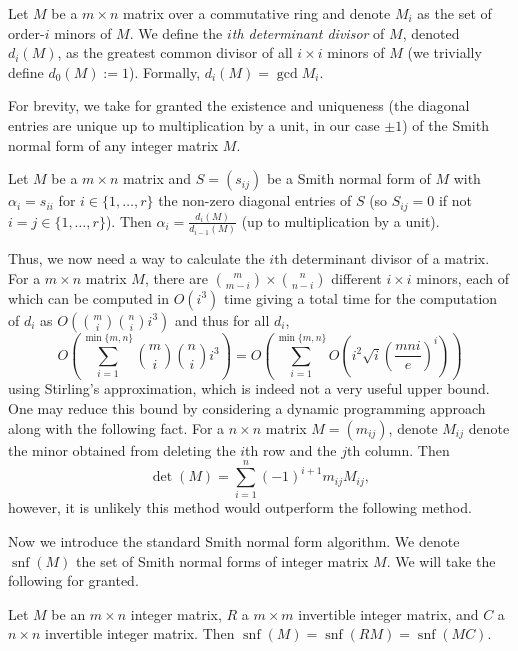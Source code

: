 \begin{definition}
	Let $M$ be a $m \times n$ matrix over a commutative ring and denote $M_i$ as the set of order-$i$ minors of $M$. We define the \emph{$i$th determinant divisor} of $M$, denoted $d_i(M)$, as the greatest common divisor of all $i \times i$ minors of $M$ (we trivially define $d_0(M) := 1$). Formally, $d_i(M) = \gcd M_i$.
\end{definition}

For brevity, we take for granted the existence and uniqueness (the diagonal entries are unique up to multiplication by a unit, in our case $\pm 1$) of the Smith normal form of any integer matrix $M$.

\begin{theorem}
	Let $M$ be a $m \times n$ matrix and $S = (s_{ij})$ be a Smith normal form of $M$ with $\alpha_i = s_{ii}$ for $i \in \{1, \ldots, r\}$ the non-zero diagonal entries of $S$ (so $S_{ij} = 0$ if not $i = j \in \{1, \ldots, r\}$). Then
	$\alpha_i = \frac{d_i(M)}{d_{i-1}(M)}$ (up to multiplication by a unit).
\end{theorem}

Thus, we now need a way to calculate the $i$th determinant divisor of a matrix. For a $m \times n$ matrix $M$, there are $\binom m{m-i} \times \binom n{n-i}$ different $i \times i$ minors, each of which can be computed in $O(i^3)$ time giving a total time for the computation of $d_i$ as $O\left( \binom m{i} \binom n{i} i^3 \right)$ and thus for all $d_i$,
\[
	O\left(
		\sum_{i=1}^{\min\{m,n\}} \binom mi \binom ni i^3 
	\right)
	=
	O\left(
		\sum_{i=1}^{\min\{m,n\}} O\left(
			i^2\sqrt i \left(
				\frac{mni}{e}
			\right)^i
		\right)
	\right)
\]
using Stirling's approximation, which is indeed not a very useful upper bound. One may reduce this bound by considering a dynamic programming approach along with the following fact. For a $n \times n$ matrix $M = (m_{ij})$, denote $M_{ij}$ denote the minor obtained from deleting the $i$th row and the $j$th column. Then
\[ \det(M) = \sum_{i=1}^n (-1)^{i+1} m_{ij} M_{ij}, \]
however, it is unlikely this method would outperform the following method.

Now we introduce the standard Smith normal form algorithm. We denote $\operatorname{snf}(M)$ the set of Smith normal forms of integer matrix $M$. We will take the following for granted.

\begin{theorem}
	Let $M$ be an $m \times n$ integer matrix, $R$ a $m \times m$ invertible integer matrix, and $C$ a $n \times n$ invertible integer matrix. Then $\operatorname{snf}{(M)} = \operatorname{snf}{(RM)} = \operatorname{snf}{(MC)}$.
\end{theorem}


